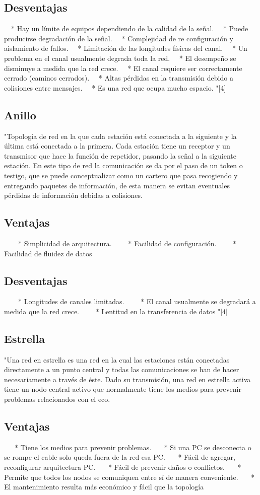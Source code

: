 \documentclass{bmcart}
\begin{document}
\subsection*{Desventajas}
  * Hay un límite de equipos dependiendo de la calidad de la señal.
  * Puede producirse degradación de la señal.
  * Complejidad de re configuración y aislamiento de fallos.
  * Limitación de las longitudes físicas del canal.
  * Un problema en el canal usualmente degrada toda la red.
  * El desempeño se disminuye a medida que la red crece.
  * El canal requiere ser correctamente cerrado (caminos cerrados).
  * Altas pérdidas en la transmisión debido a colisiones entre mensajes.
  * Es una red que ocupa mucho espacio.
"[4]
\subsection*{Anillo}
"Topología de red en la que cada estación está conectada a la siguiente y la última está conectada a
la primera. Cada estación tiene un receptor y un transmisor que hace la función de repetidor,
pasando la señal a la siguiente estación.
En este tipo de red la comunicación se da por el paso de un token o testigo, que se puede
conceptualizar como un cartero que pasa recogiendo y entregando paquetes de información, de
esta manera se evitan eventuales pérdidas de información debidas a colisiones.
\subsection*{Ventajas}
    * Simplicidad de arquitectura.
    * Facilidad de configuración.
    * Facilidad de fluidez de datos
\subsection*{Desventajas}
    * Longitudes de canales limitadas.
    * El canal usualmente se degradará a medida que la red crece.
    * Lentitud en la transferencia de datos
"[4]
\subsection*{Estrella} 
"Una red en estrella es una red en la cual las estaciones están conectadas directamente a un punto
central y todas las comunicaciones se han de hacer necesariamente a través de éste.
Dado su transmisión, una red en estrella activa tiene un nodo central activo que normalmente
tiene los medios para prevenir problemas relacionados con el eco.
\subsection*{Ventajas}
   * Tiene los medios para prevenir problemas.
   * Si una PC se desconecta o se rompe el cable solo queda fuera de la red esa PC.
   * Fácil de agregar, reconfigurar arquitectura PC.
   * Fácil de prevenir daños o conflictos.
   * Permite que todos los nodos se comuniquen entre sí de manera conveniente.
   * El mantenimiento resulta más económico y fácil que la topología
\end{document}
